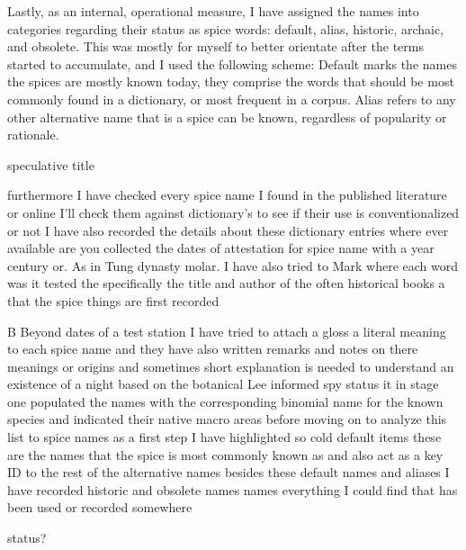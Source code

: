 Lastly, as an internal, operational measure, I have assigned the names into categories regarding their status as spice words: default, alias, historic, archaic, and obsolete. This was mostly for myself to better orientate after the terms started to accumulate, and I used the following scheme: Default marks the names the spices are mostly known today, they comprise the words that should be most commonly found in a dictionary, or most frequent in a corpus. %
Alias refers to any other alternative name that is a spice can be known, regardless of popularity or rationale. 



speculative
title


furthermore I have checked every spice name I found in the published literature or online I'll check them against dictionary's to see if their use is conventionalized or not   I have also recorded the details about these dictionary entries where ever available are you collected the dates of attestation for spice name with a year century or. As in Tung dynasty molar. I have also tried to Mark where each word was it tested the specifically the title and author of the often historical books  a that the spice things are first recorded 

 B Beyond dates of a test station I have tried to attach a gloss a literal meaning to each spice name and they have also written remarks and notes on there meanings or origins and sometimes short explanation is needed to understand an existence of a night based on the botanical Lee informed spy status it in stage one populated the names with the corresponding   binomial name for the known species and indicated their native macro areas before moving on to analyze this list to spice names as a first step I have highlighted so cold default items these are the names that the spice is most commonly known as and also act as a key ID   to the rest of the alternative names besides these default names and aliases I have recorded historic and obsolete names names everything I could find that has been used or recorded somewhere 
 
 




status?







